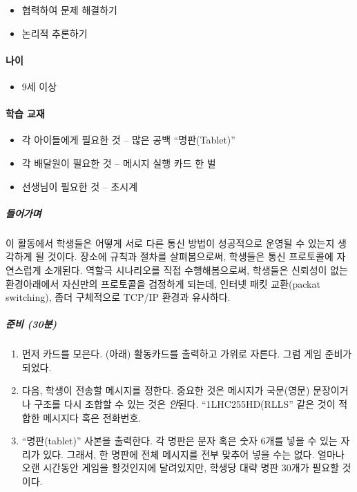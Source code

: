 \documentclass[]{article}
\begin{document}
\begin{itemize}
\itemsep1pt\parskip0pt
\item
  협력하여 문제 해결하기
\item
  논리적 추론하기
\end{itemize}

\mbox{}\paragraph{나이}\label{section-146}

\begin{itemize}
\itemsep1pt\parskip0pt
\item
  9세 이상
\end{itemize}

\mbox{}\paragraph{학습 교재}\label{section-147}

\begin{itemize}
\itemsep1pt\parskip0pt
\item
  각 아이들에게 필요한 것 -- 많은 공백 ``명판(Tablet)''
\item
  각 배달원이 필요한 것 -- 메시지 실행 카드 한 벌
\item
  선생님이 필요한 것 -- 초시계
\end{itemize}


\subparagraph{들어가며}\label{section-148}

이 활동에서 학생들은 어떻게 서로 다른 통신 방법이 성공적으로 운영될 수
있는지 생각하게 될 것이다. 장소에 규칙과 절차를 살펴봄으로써, 학생들은
통신 프로토콜에 자연스럽게 소개된다. 역할극 시나리오를 직접
수행해봄으로써, 학생들은 신뢰성이 없는 환경아래에서 자신만의 프로토콜을
검정하게 되는데, 인터넷 패킷 교환(packat switching), 좀더 구체적으로
TCP/IP 환경과 유사하다.

\subparagraph{준비 (30분)}\label{section-149}

\begin{enumerate}
\item
  먼저 카드를 모은다. (아래) 활동카드를 출력하고 가위로 자른다. 그럼
  게임 준비가 되었다.
\item
  다음, 학생이 전송할 메시지를 정한다. 중요한 것은 메시지가 국문(영문)
  문장이거나 구조를 다시 조합할 수 있는 것은 \emph{안}된다.
  ``1LHC255HD(RLLS'' 같은 것이 적합한 메시지다 혹은 전화번호.
\item
  ``명판(tablet)'' 사본을 출력한다. 각 명판은 문자 혹은 숫자 6개를 넣을
  수 있는 자리가 있다. 그래서, 한 명판에 전체 메시지를 전부 맞추어 넣을
  수는 없다. 얼마나 오랜 시간동안 게임을 할것인지에 달려있지만, 학생당
  대략 명판 30개가 필요할 것이다.
\end{enumerate}
\end{document}
